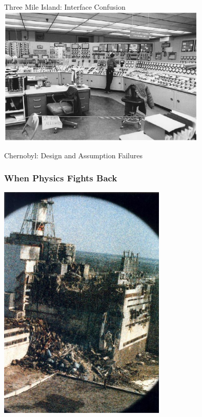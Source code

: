\documentclass{beamer}
\begin{document}
\begin{frame}{Three Mile Island: Interface Confusion}
  \centering
  \includegraphics[width=0.75\textwidth]{tmicontrolroom.png}
\end{frame}

\begin{frame}{Chernobyl: Design and Assumption Failures}
  \subsubsection*{When Physics Fights Back}
  \includegraphics[width=0.6\textwidth]{chernobylafter.jpg}
\end{frame}
\end{document}
